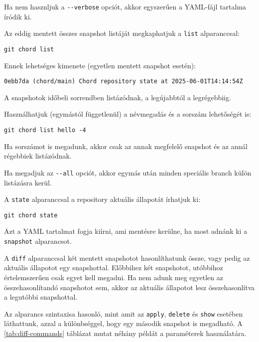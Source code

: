 \documentclass[
]{elteikthesis}[2025/03/25]
\begin{document}
Ha nem hasznljuk a \verb|--verbose| opciót, akkor egyszerűen a YAML-fájl tartalma íródik ki.

Az eddig mentett összes snapshot listáját megkaphatjuk a \verb|list| alparanccsal:

\begin{verbatim}
git chord list
\end{verbatim}

Ennek lehetséges kimenete (egyetlen mentett snapshot esetén):

\begin{verbatim}
0ebb7da (chord/main) Chord repository state at 2025-06-01T14:14:54Z
\end{verbatim}

A snapshotok időbeli sorrendben listázódnak, a legújabbtól a legrégebbiig.

Használhatjuk (egymástól függetlenül) a névmegadás és a sorszám lehetőségét is:

\begin{verbatim}
git chord list hello -4
\end{verbatim}

Ha sorszámot is megadunk, akkor csak az annak megfelelő snapshot és az annál régebbiek listázódnak.

Ha megadjuk az \verb|--all| opciót, akkor egymás után minden speciális branch külön listázásra kerül.

A \verb|state| alparanccsal a repository aktuális állapotát írhatjuk ki:

\begin{verbatim}
git chord state
\end{verbatim}

Azt a YAML tartalmat fogja kiírni, ami mentésre kerülne, ha most adnánk ki a \verb|snapshot| alparancsot.

A \verb|diff| alparanccsal két mentett snapshotot hasonlíthatunk össze,
vagy pedig az aktuális állapotot egy snapshottal.
Előbbihez két snapshotot, utóbbihoz értelemszerűen csak egyet kell megadni.
Ha nem adunk meg egyetlen az összehasonlítandó snapshotot sem,
akkor az aktuális állapotot lesz összehasonlítva a legutóbbi snapshottal.

Az alparancs szintaxisa hasonló, mint amit az \verb|apply|, \verb|delete| és \verb|show|
esetében láthattunk,
azzal a különbséggel, hogy egy második snapshot is megadható.
A \ref{tab:diff-commands} táblázat mutat néhány példát a paraméterek használatára.
\end{document}
